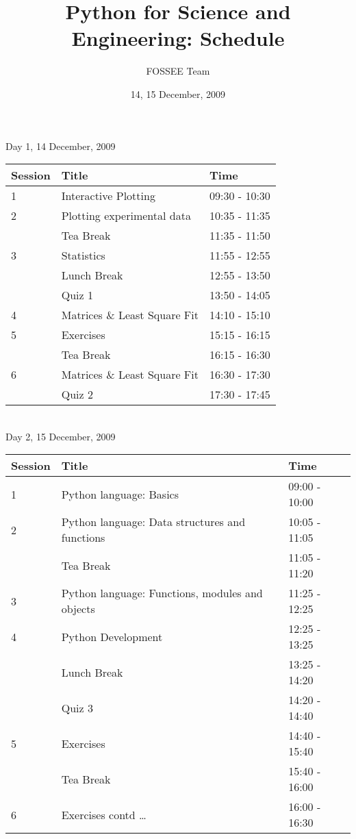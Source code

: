 \documentclass[14pt]{article}
\title{Python for Science and Engineering: Schedule}
\author{FOSSEE Team}
\date{14, 15 December, 2009}
\begin{document}
  \maketitle
  Day 1, 14 December, 2009 \\
  \begin{tabular}{| p{.35in} | p{2in} | p{1in} |}
    \hline
    Session & Title & Time \\\hline
    1 & Interactive Plotting & 09:30 - 10:30 \\\hline
    2 & Plotting experimental data & 10:35 - 11:35 \\\hline
    & Tea Break & 11:35 - 11:50 \\\hline
    3 & Statistics & 11:55 - 12:55 \\\hline
    & Lunch Break & 12:55 - 13:50 \\\hline
    & Quiz 1 & 13:50 - 14:05 \\\hline
    4 & Matrices \& Least Square Fit & 14:10 - 15:10 \\\hline
    5 & Exercises & 15:15 - 16:15 \\\hline
    & Tea Break & 16:15 - 16:30 \\\hline
    6 & Matrices \& Least Square Fit & 16:30 - 17:30 \\\hline
    & Quiz 2 & 17:30 - 17:45 \\\hline
  \end{tabular}
  \vspace*{.5in}
  \\ Day 2, 15 December, 2009 \\
  \begin{tabular}{| p{.35in} | p{2in} | p{1in} |}
    \hline
    Session & Title & Time \\\hline
    1 & Python language: Basics & 09:00 - 10:00 \\\hline
    2 & Python language: Data structures and functions & 10:05 - 11:05 \\\hline
    & Tea Break & 11:05 - 11:20 \\\hline
    3 & Python language: Functions, modules and objects & 11:25 - 12:25 \\\hline
    4 & Python Development & 12:25 - 13:25 \\\hline
    & Lunch Break & 13:25 - 14:20 \\\hline
    & Quiz 3 & 14:20 - 14:40 \\\hline
    5 & Exercises & 14:40 - 15:40 \\\hline
    & Tea Break & 15:40 - 16:00 \\\hline
    6 & Exercises contd \ldots & 16:00 - 16:30 \\\hline
  \end{tabular}
\end{document}
